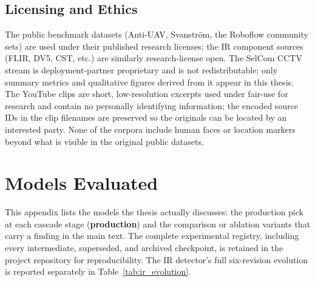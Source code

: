 \section{Licensing and Ethics}

The public benchmark datasets (Anti-UAV, Svanstr\"om, the Roboflow community sets) are used under their published research licenses; the IR component sources (FLIR, DV5, CST, etc.) are similarly research-license open. The SelCom CCTV stream is deployment-partner proprietary and is not redistributable; only summary metrics and qualitative figures derived from it appear in this thesis. The YouTube clips are short, low-resolution excerpts used under fair-use for research and contain no personally identifying information; the encoded source IDs in the clip filenames are preserved so the originals can be located by an interested party. None of the corpora include human faces or location markers beyond what is visible in the original public datasets.

\chapter{Models Evaluated}
\label{app:models}

This appendix lists the models the thesis actually discusses: the production pick at each cascade stage (\textbf{production}) and the comparison or ablation variants that carry a finding in the main text. The complete experimental registry, including every intermediate, superseded, and archived checkpoint, is retained in the project repository for reproducibility. The IR detector's full six-revision evolution is reported separately in Table~\ref{tab:ir_evolution}.

